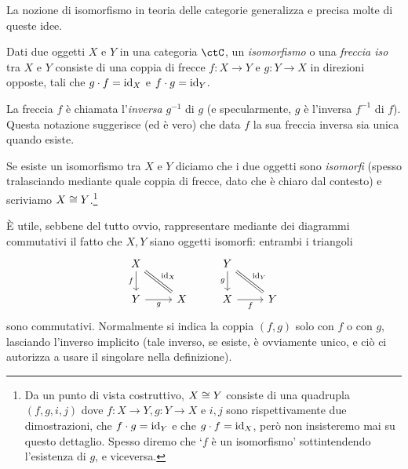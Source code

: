 La nozione di isomorfismo in teoria delle categorie generalizza e precisa molte di queste idee.
\begin{definition}[Isomorfismo]\label{def_isomorfismo}
 Dati due oggetti \(X\) e \(Y\) in una categoria \(\ctC\), un \emph{isomorfismo} o una \emph{freccia iso} tra \(X\) e \(Y\) consiste di una coppia di frecce \(f\colon X\to Y\) e \(g\colon Y\to X\) in direzioni opposte, tali che \(g\cdot f=\mathrm{id}_X\) e \(f\cdot g=\mathrm{id}_Y\).

 La freccia \(f\) è chiamata l'\emph{inversa} \(g^{-1}\) di \(g\) (e specularmente, \(g\) è l'inversa \(f^{-1}\) di \(f\)). Questa notazione suggerisce (ed è vero) che data \(f\) la sua freccia inversa sia unica quando esiste.

 Se esiste un isomorfismo tra \(X\) e \(Y\) diciamo che i due oggetti sono \emph{isomorfi} (spesso tralasciando mediante quale coppia di frecce, dato che è chiaro dal contesto) e scriviamo \(X\cong Y\).\footnote{Da un punto di vista costruttivo, \(X\cong Y\) consiste di una quadrupla \((f,g, i,j)\) dove \(f \colon X\to Y, g\colon Y\to X\) e \(i,j\) sono rispettivamente due dimostrazioni, che \(f\cdot g= \mathrm{id}_Y\) e che \(g\cdot f=\mathrm{id}_X\), però non insisteremo mai su questo dettaglio. Spesso diremo che `\(f\) è un isomorfismo' sottintendendo l'esistenza di \(g\), e viceversa.}
\end{definition}
È utile, sebbene del tutto ovvio, rappresentare mediante dei diagrammi commutativi il fatto che \(X,Y\) siano oggetti isomorfi: entrambi i triangoli
\[
 \begin{tikzcd}
  X\ar[d, "f"'] \ar[dr, equal, "\id_X"]& & Y \ar[dr, equal, "\id_Y"]\ar[d,"g"']\\
  Y \ar[r, "g"']& X & X \ar[r, "f"']& Y
 \end{tikzcd}
\]
sono commutativi. Normalmente si indica la coppia \((f,g)\) solo con \(f\) o con \(g\), lasciando l'inverso implicito (tale inverso, se esiste, è ovviamente unico, e ciò ci autorizza a usare il singolare nella definizione).
